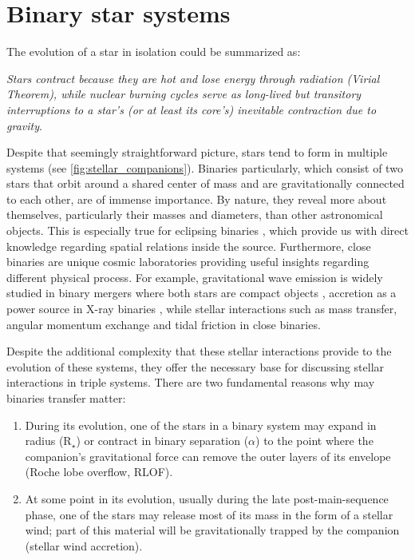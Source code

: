\section{Binary star systems}\label{sec:binary_evolution}

The evolution of a star in isolation could be summarized as:

{\it Stars contract because they are hot and lose energy through radiation (Virial Theorem), while nuclear burning cycles serve as long-lived but transitory interruptions to a star's (or at least its core's) inevitable contraction due to gravity}. 

Despite that seemingly straightforward picture, stars tend to form in multiple systems (see \cref{fig:stellar_companions}). Binaries particularly, which consist of two stars that orbit around a shared center of mass and are gravitationally connected to each other, are of immense importance. By nature, they reveal more about themselves, particularly their masses and diameters, than other astronomical objects. This is especially true for eclipsing binaries \citep{prvsa2016physics}, which provide us with direct knowledge regarding spatial relations inside the source. Furthermore, close binaries are unique cosmic laboratories providing useful insights regarding different physical process. For example, gravitational wave emission is widely studied in binary mergers where both stars are compact objects \citep{cutler1994gravitational,abbott2017gw170608,abbott2019gwtc}, accretion as a power source in X-ray binaries \citep{lewin1997x,reig2011x}, while stellar interactions such as mass transfer, angular momentum exchange and tidal friction in close binaries. 


Despite the additional complexity that these stellar interactions provide to the evolution of these systems, they offer the necessary base for discussing stellar interactions in triple systems.  There are two fundamental reasons why may binaries transfer matter:

\begin{enumerate}
    \item During its evolution, one of the stars in a binary system may expand in radius (R$_{\star}$) or contract in binary separation (${\alpha}$) to the point where the companion's gravitational force can remove the outer layers of its envelope (Roche lobe overflow, RLOF).
    \item At some point in its evolution, usually during the late post-main-sequence phase, one of the stars may release most of its mass in the form of a stellar wind; part of this material will be gravitationally trapped by the companion (stellar wind accretion). 
\end{enumerate}

